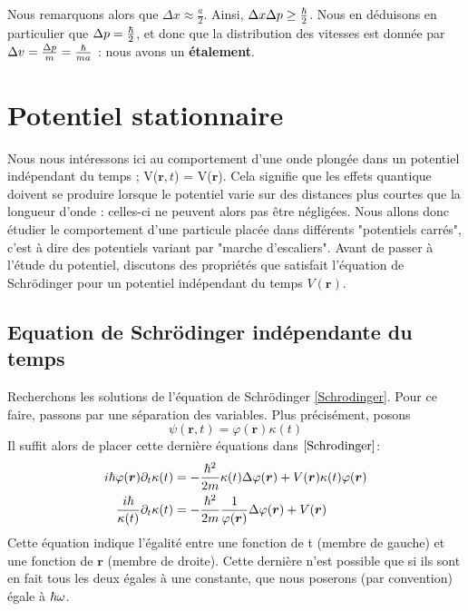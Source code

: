 \documentclass[../notesdecours]{subfiles}
\begin{document}

Nous remarquons alors que $\Delta x \approx \frac{a}{2}$. Ainsi, $\Delta x\Delta p \geq \frac{\hbar}{2}$. Nous en déduisons en particulier que $\Delta p = \frac{\hbar}{2}$, et donc que la distribution des vitesses est donnée par $\Delta v = \frac{\Delta p}{m} = \frac{\hbar}{ma}$ : nous avons un \textbf{étalement}.

\section{Potentiel stationnaire}
Nous nous intéressons ici au comportement d'une onde plongée dans un potentiel indépendant du temps ; V($\bm{r},t$) = V($\bm{r}$). Cela signifie que les effets quantique doivent se produire lorsque le potentiel varie sur des distances plus courtes que la longueur d'onde : celles-ci ne peuvent alors pas être négligées.  Nous allons donc étudier le comportement d'une particule placée dans différents "potentiels carrés", c'est à dire des potentiels variant par "marche d'escaliers". Avant de passer à l'étude du potentiel, discutons des propriétés que satisfait l'équation de Schrödinger pour un potentiel indépendant du temps $V(\bm{r})$.

\subsection{Equation de Schrödinger indépendante du temps}

Recherchons les solutions de l'équation de Schrödinger \eqref{Schrodinger}. Pour ce faire, passons par une séparation des variables. Plus précisément, posons
\begin{equation}
\psi(\bm{r},t) = \varphi(\bm{r})\kappa(t)
\end{equation}
Il suffit alors de placer cette dernière équations dans $\eqref{Schrodinger}$:
\begin{align}
i \hbar \varphi(\bm{r})\partial_t \kappa(t) &= - \frac{\hbar^2}{2m} \kappa(t) \Delta \varphi(\bm{r}) + V(\bm{r})\kappa(t)\varphi(\bm{r})\\
\frac{i\hbar}{\kappa(t)} \partial_t \kappa(t) &= - \frac{\hbar^2}{2m} \frac{1}{\varphi(\bm{r})} \Delta \varphi(\bm{r}) + V(\bm{r})
\label{Séparation temporelle et spatiale}
\end{align}
Cette équation indique l'égalité entre une fonction de t (membre de gauche) et une fonction de $\bm{r}$ (membre de droite). Cette dernière n'est possible que si ils sont en fait tous les deux égales à une constante, que nous poserons (par convention) égale à $\hbar \omega$.\\
\end{document}
